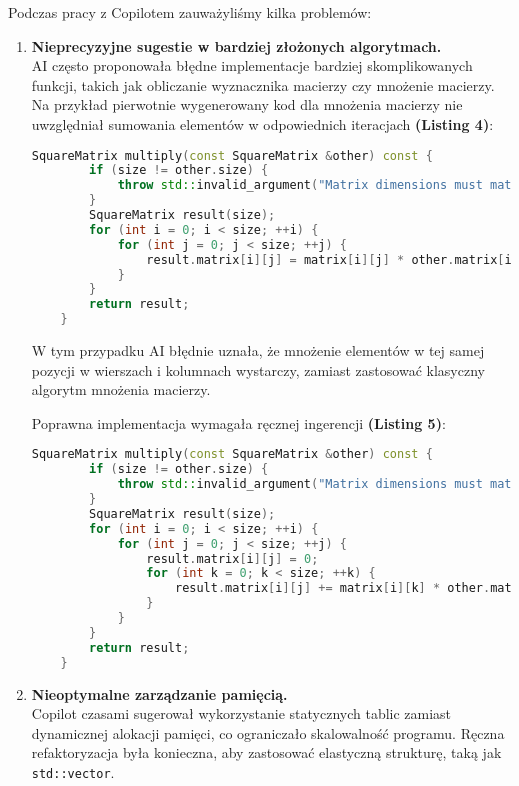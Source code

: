 Podczas pracy z Copilotem zauważyliśmy kilka problemów:

\begin{enumerate}
  \item \textbf{Nieprecyzyjne sugestie w bardziej złożonych algorytmach.} \\
        AI często proponowała błędne implementacje bardziej skomplikowanych funkcji, takich jak obliczanie wyznacznika macierzy czy mnożenie macierzy. Na przykład pierwotnie wygenerowany kod dla mnożenia macierzy nie uwzględniał sumowania elementów w odpowiednich iteracjach \textbf{(Listing 4)}:

        \begin{lstlisting}[language=C++, caption=Błędna implementacja mnożenia macierzy]
    SquareMatrix multiply(const SquareMatrix &other) const {
        if (size != other.size) {
            throw std::invalid_argument("Matrix dimensions must match");
        }
        SquareMatrix result(size);
        for (int i = 0; i < size; ++i) {
            for (int j = 0; j < size; ++j) {
                result.matrix[i][j] = matrix[i][j] * other.matrix[i][j]; // BLAD
            }
        }
        return result;
    }
    \end{lstlisting}

        W tym przypadku AI błędnie uznała, że mnożenie elementów w tej samej pozycji w wierszach i kolumnach wystarczy, zamiast zastosować klasyczny algorytm mnożenia macierzy.

        Poprawna implementacja wymagała ręcznej ingerencji \textbf{(Listing 5)}:

        \begin{lstlisting}[language=C++, caption=Poprawna implementacja mnożenia macierzy]
    SquareMatrix multiply(const SquareMatrix &other) const {
        if (size != other.size) {
            throw std::invalid_argument("Matrix dimensions must match");
        }
        SquareMatrix result(size);
        for (int i = 0; i < size; ++i) {
            for (int j = 0; j < size; ++j) {
                result.matrix[i][j] = 0;
                for (int k = 0; k < size; ++k) {
                    result.matrix[i][j] += matrix[i][k] * other.matrix[k][j];
                }
            }
        }
        return result;
    }
    \end{lstlisting}

  \item \textbf{Nieoptymalne zarządzanie pamięcią.} \\
        Copilot czasami sugerował wykorzystanie statycznych tablic zamiast dynamicznej alokacji pamięci, co ograniczało skalowalność programu. Ręczna refaktoryzacja była konieczna, aby zastosować elastyczną strukturę, taką jak \texttt{std::vector}.
\end{enumerate}

